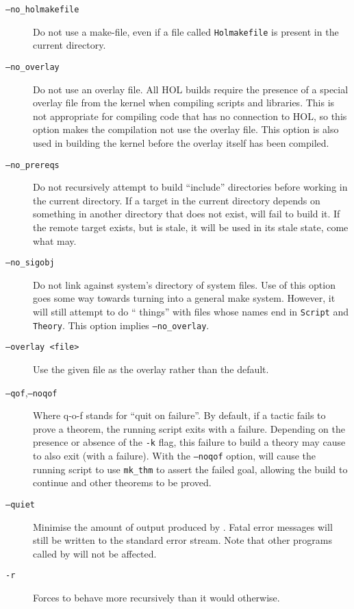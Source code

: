 \begin{description}
\item[\texttt{--no\_holmakefile}]  Do not use a make-file, even if a file
  called \texttt{Holmakefile} is present in the current directory.
\item[\texttt{--no\_overlay}] Do not use an overlay file.  All HOL
  builds require the presence of a special overlay file from the
  kernel when compiling scripts and libraries.  This is not
  appropriate for compiling code that has no connection to HOL, so
  this option makes the compilation not use the overlay file.  This
  option is also used in building the kernel before the overlay itself
  has been compiled.
\item[\texttt{--no\_prereqs}]%
%
Do not recursively attempt to build ``include'' directories before working in the current directory.
If a target in the current directory depends on something in another directory that does not exist, \holmake{} will fail to build it.
If the remote target exists, but is stale, it will be used in its stale state, come what may.
\item[\texttt{--no\_sigobj}]
  Do not link against \HOL{} system's directory of \HOL{} system files.
  Use of this option goes some way towards turning \holmake{} into a general \ML{} \textsf{make} system.
  However, it will still attempt to do ``\HOL{} things'' with files whose names end in \texttt{Script} and \texttt{Theory}.
  This option implies \texttt{--no\_overlay}.
\item[\texttt{--overlay <file>}] Use the given file as the overlay
  rather than the default.
\item[\texttt{--qof},\texttt{--noqof}]
  Where q-o-f stands for ``quit on failure''.
  By default, if a tactic fails to prove a theorem, the running script exits with a failure.
  Depending on the presence or absence of the \texttt{-k} flag, this failure to build a theory may cause \holmake{} to also exit (with a failure).
  With the \texttt{--noqof} option, \holmake{} will cause the running script to use \texttt{mk\_thm} to assert the failed goal, allowing the build to continue and other theorems to be proved.
\item[\texttt{--quiet}] Minimise the amount of output produced by
  \holmake{}.  Fatal error messages will still be written to the
  standard error stream.  Note that other programs called by \holmake{} will not
  be affected.
\item[\texttt{-r}]%
%
Forces \holmake{} to behave more recursively than it would otherwise.

\end{description}
